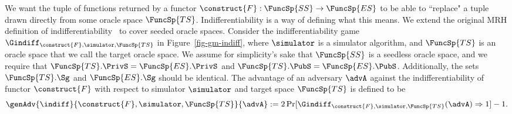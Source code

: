 We want the tuple of functions returned by a functor $\construct{F}: \FuncSp{SS} \to \FuncSp{ES}$ to be able to ``replace" a tuple drawn directly from some oracle space $\FuncSp{TS}$. 
Indifferentiability is a way of defining what this means.  
We extend the original MRH definition of indifferentiability~\cite{TCC:MauRenHol04} to cover seeded oracle spaces. 
Consider the indifferentiability game $\Gindiff_{\construct{F},\simulator,\FuncSp{TS}}$ in Figure~\ref{fig-gm-indiff}, where $\simulator$ is a simulator algorithm, and $\FuncSp{TS}$ is an oracle space that we call the target oracle space.
We assume for simplicity's sake that $\FuncSp{SS}$ is a seedless oracle space, and we require that $\FuncSp{TS}.\PrivS = \FuncSp{ES}.\PrivS$ and $\FuncSp{TS}.\PubS = \FuncSp{ES}.\PubS$. 
Additionally, the sets $\FuncSp{TS}.\Sg$ and $\FuncSp{ES}.\Sg$ should be identical. The advantage of an adversary $\advA$ against the indifferentiability of functor $\construct{F}$ with respect to simulator $\simulator$ and target space $\FuncSp{TS}$ is defined to be 
\[\genAdv{\indiff}{\construct{F},\simulator,\FuncSp{TS}}{\advA} := 2\Pr[\Gindiff_{\construct{F},\simulator,\FuncSp{TS}}(\advA) \Rightarrow 1] - 1.\]

